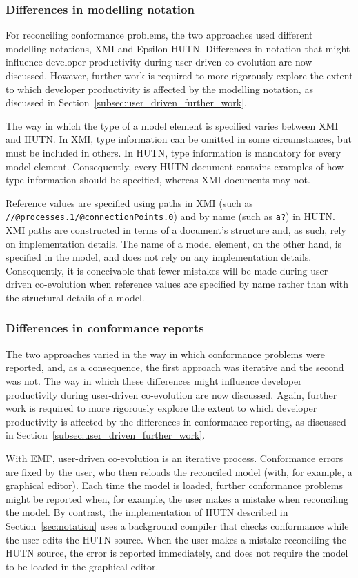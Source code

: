 \subsubsection{Differences in modelling notation}
For reconciling conformance problems, the two approaches used different modelling notations, XMI and Epsilon HUTN. Differences in notation that might influence developer productivity during user-driven co-evolution are now discussed. However, further work is required to more rigorously explore the extent to which developer productivity is affected by the modelling notation, as discussed in Section~\ref{subsec:user_driven_further_work}.

The way in which the type of a model element is specified varies between XMI and HUTN. In XMI, type information can be omitted in some circumstances, but must be included in others. In HUTN, type information is mandatory for every model element. Consequently, every HUTN document contains examples of how type information should be specified, whereas XMI documents may not. 

Reference values are specified using paths in XMI (such as \texttt{//@pro\-ces\-ses.1/@con\-nec\-ti\-onPo\-in\-ts.0}) and by name (such as \texttt{a?}) in HUTN. XMI paths are constructed in terms of a document's structure and, as such, rely on implementation details. The name of a model element, on the other hand, is specified in the model, and does not rely on any implementation details. Consequently, it is conceivable that fewer mistakes will be made during user-driven co-evolution when reference values are specified by name rather than with the structural details of a model.

\subsubsection{Differences in conformance reports}
The two approaches varied in the way in which conformance problems were reported, and, as a consequence, the first approach was iterative and the second was not. The way in which these differences might influence developer productivity during user-driven co-evolution are now discussed. Again, further work is required to more rigorously explore the extent to which developer productivity is affected by the differences in conformance reporting, as discussed in Section~\ref{subsec:user_driven_further_work}.

With EMF, user-driven co-evolution is an iterative process. Conformance errors are fixed by the user, who then reloads the reconciled model (with, for example, a graphical editor). Each time the model is loaded, further conformance problems might be reported when, for example, the user makes a mistake when reconciling the model. By contrast, the implementation of HUTN described in Section~\ref{sec:notation} uses a background compiler that checks conformance while the user edits the HUTN source. When the user makes a mistake reconciling the HUTN source, the error is reported immediately, and does not require the model to be loaded in the graphical editor.

